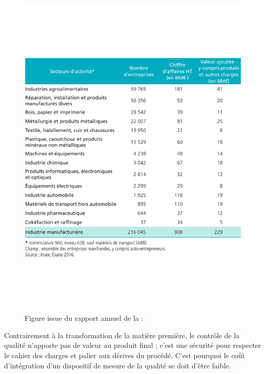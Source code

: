 \begin{figure}[hbtp]
	\centering
	\includegraphics[width=\textwidth,height=\textheight,keepaspectratio]{../Chap1/Figures/2018-Chiffres-cles-industrie-manufacturiere-secteur.pdf}
	\caption{Figure issue du rapport annuel de la \citeauthor{directiongeneraledesentreprises_chiffres_2019} :   \cite{directiongeneraledesentreprises_chiffres_2019}}
	\label{tab:state_art_compare}
\end{figure}

Contrairement à la transformation de la matière première, le contrôle de la qualité n'apporte pas de valeur au produit final ; c'est une sécurité pour respecter le cahier des charges et palier aux dérives du procédé.
C'est pourquoi le coût d'intégration d'un dispositif de mesure de la qualité se doit d'être faible.


